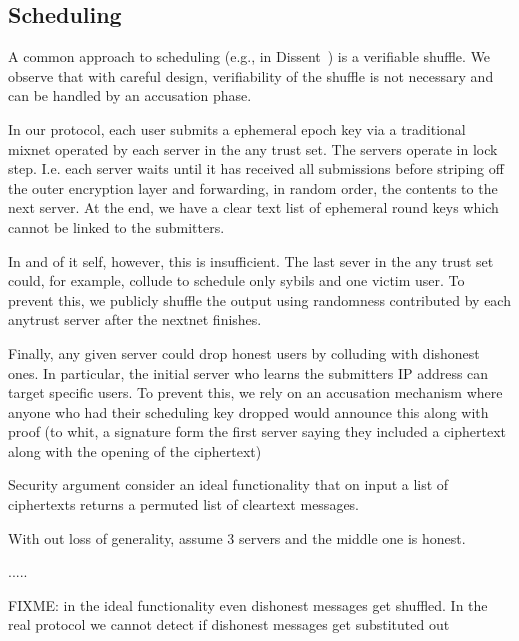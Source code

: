 \subsection{Scheduling }
A common approach to scheduling (e.g., in Dissent~\cite{CCS:CorFor10}) is a verifiable shuffle.  We observe that with careful design, verifiability of the shuffle is not necessary and can be handled by an accusation phase.

In our protocol, each user submits a ephemeral epoch key via a traditional mixnet operated by each server in the any trust set. The servers operate in lock step. I.e. each server waits until it has received all submissions before striping off the outer encryption layer and forwarding, in random order, the contents to the next server. At the end, we have a clear text list of ephemeral round keys which cannot be linked to the submitters.

In and of it self, however, this is insufficient.  The last sever in the any trust set could, for example,  collude to schedule only sybils and one victim user. To prevent this, we publicly shuffle the  output using randomness contributed by each anytrust server after the nextnet finishes.

Finally, any given server could drop honest users  by colluding with dishonest ones. In particular, the initial server who learns the submitters IP address can target specific users. To prevent this, we rely on an accusation mechanism where anyone who had their scheduling key dropped would announce this along with proof (to whit, a signature form the first server saying they included a ciphertext along with the opening of the ciphertext)


Security argument consider an ideal functionality that on input a list of ciphertexts returns a permuted list of cleartext messages.

With out loss of generality, assume  3 servers and the middle one is honest. 

.....

FIXME: in the ideal functionality even dishonest messages get shuffled. In the real protocol we cannot detect if dishonest messages get substituted out 





